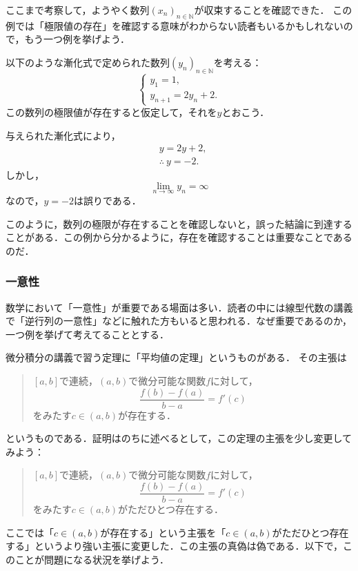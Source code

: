 \documentclass[a4paper,11pt]{ltjsarticle}
\newenvironment{tleftbar}{\begin{tbleftline}\setlength{\parindent}{1\zw}}{\end{tbleftline}}
\begin{document}
ここまで考察して，ようやく数列$(x_n)_{n \in \mathbb{N}}$が収束することを確認できた．
この例では「極限値の存在」を確認する意味がわからない読者もいるかもしれないので，もう一つ例を挙げよう．


以下のような漸化式で定められた数列$(y_n)_{n \in \mathbb{N}}$を考える：
\[
\begin{cases}
y_1 =1 ,\\
y_{n+1}= 2y_n +2.
\end{cases}
\]
この数列の極限値が存在すると仮定して，それを$y$とおこう．
\begin{tleftbar}
与えられた漸化式により，
\begin{align*} 
  & y = 2y +2, \\
  & \therefore ~ y = -2.
\end{align*}
しかし，
\[
\lim_{n \to \infty} y_n = \infty
\]
なので，$y=-2$は誤りである．
\end{tleftbar}

このように，数列の極限が存在することを確認しないと，誤った結論に到達することがある．この例から分かるように，存在を確認することは重要なことであるのだ．


\subsubsection{一意性}

数学において「一意性」が重要である場面は多い．読者の中には線型代数の講義で「逆行列の一意性」などに触れた方もいると思われる．なぜ重要であるのか，一つ例を挙げて考えてることとする．

微分積分の講義で習う定理に「平均値の定理」というものがある．
その主張は
\begin{quotation}
	$[a,b]$で連続，$(a,b)$で微分可能な関数$f$に対して，
	\[
	\frac{f(b)-f(a)}{b-a}=f'(c)
	\]
	をみたす$ c \in (a,b)$が存在する．
\end{quotation}

というものである．証明はのちに述べるとして，この定理の主張を少し変更してみよう：

\begin{quotation}
	$[a,b]$で連続，$(a,b)$で微分可能な関数$f$に対して，
	\[
	\frac{f(b)-f(a)}{b-a}=f'(c)
	\]
	をみたす$ c \in (a,b)$がただひとつ存在する．
\end{quotation}

ここでは「$c \in (a,b)$が存在する」という主張を「$c \in (a,b)$がただひとつ存在する」というより強い主張に変更した．この主張の真偽は偽である．以下で，このことが問題になる状況を挙げよう．
\end{document}

